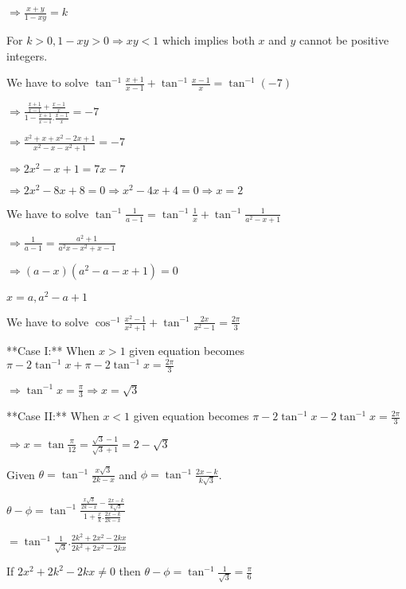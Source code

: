   $\Rightarrow \frac{x + y}{1 - xy} = k$

  For $k > 0, 1 - xy > 0 \Rightarrow xy < 1$ which implies both $x$ and $y$ cannot be positive integers.

\item We have to solve $\tan^{-1}\frac{x + 1}{x - 1} + \tan^{-1}\frac{x - 1}{x} = \tan^{-1}(-7)$

  $\Rightarrow \frac{\frac{x + 1}{x - 1} + \frac{x - 1}{x}}{1 - \frac{x + 1}{x - 1}.\frac{x - 1}{x}} = -7$

  $\Rightarrow \frac{x^2 + x + x^2 - 2x + 1}{x^2 - x - x^2 + 1} = -7$

  $\Rightarrow 2x^2 - x + 1 = 7x - 7$

  $\Rightarrow 2x^2 - 8x + 8 = 0 \Rightarrow x^2 - 4x + 4 = 0 \Rightarrow x = 2$

\item We have to solve $\tan^{-1}\frac{1}{a - 1} = \tan^{-1}\frac{1}{x} + \tan^{-1}\frac{1}{a^2 - x + 1}$

  $\Rightarrow \frac{1}{a - 1} = \frac{a^2 + 1}{a^2x - x^2 + x - 1}$

  $\Rightarrow (a - x)(a^2 - a - x + 1) = 0$

  $x = a, a^2 - a + 1$

\item We have to solve $\cos^{-1}\frac{x^2 - 1}{x^2 + 1} + \tan^{-1}\frac{2x}{x^2 - 1} = \frac{2\pi}{3}$

  **Case I:** When $x > 1$ given equation becomes $\pi - 2\tan^{-1}x + \pi - 2\tan^{-1}x= \frac{2\pi}{3}$

  $\Rightarrow \tan^{-1}x = \frac{\pi}{3} \Rightarrow x = \sqrt{3}$

  **Case II:** When $x < 1$ given equation becomes $\pi - 2\tan^{-1}x - 2\tan^{-1}x = \frac{2\pi}{3}$

  $\Rightarrow x = \tan\frac{\pi}{12} = \frac{\sqrt{3} - 1}{\sqrt{3} + 1} = 2 - \sqrt{3}$

\item Given $\theta = \tan^{-1}\frac{x\sqrt{3}}{2k - x}$ and $\phi = \tan^{-1}\frac{2x - k}{k\sqrt{3}}$.

  $\theta - \phi = \tan^{-1}\frac{\frac{x\sqrt{3}}{2k - x} - \frac{2x - k}{k\sqrt{3}}}{1 + \frac{x}{k}.\frac{2x - k}{2k -
    x}}$

  $= \tan^{-1}\frac{1}{\sqrt{3}}.\frac{2k^2 + 2x^2 - 2kx}{2k^2 + 2x^2 - 2kx}$

  If $2x^2 + 2k^2 - 2kx\neq 0$ then $\theta - \phi = \tan^{-1}\frac{1}{\sqrt{3}} = \frac{\pi}{6}$

